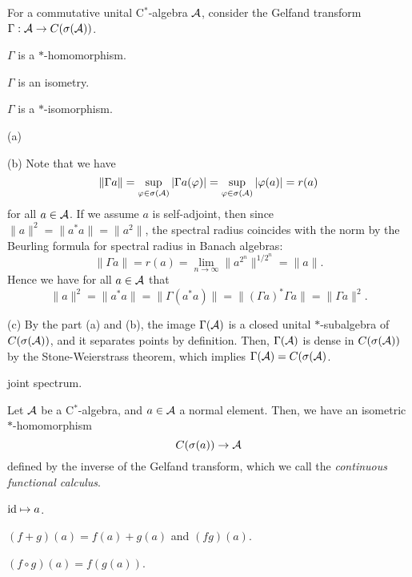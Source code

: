 \documentclass{../note}
\begin{document}
\begin{prb}
For a commutative unital C$^*$-algebra $\mathcal{A}$, consider the Gelfand transform $\Gamma:\mathcal{A}\to C(\sigma(\mathcal{A}))$.
\begin{parts}
\item $\Gamma$ is a $*$-homomorphism.
\item $\Gamma$ is an isometry.
\item $\Gamma$ is a $*$-isomorphism.
\end{parts}
\end{prb}
\begin{pf}
(a)

(b)
Note that we have
\[\|\Gamma a\|=\sup_{\varphi\in\sigma(\mathcal{A})}|\Gamma a(\varphi)|=\sup_{\varphi\in\sigma(\mathcal{A})}|\varphi(a)|=r(a)\]
for all $a\in\mathcal{A}$.
If we assume $a$ is self-adjoint, then since $\|a\|^2=\|a^*a\|=\|a^2\|$, the spectral radius coincides with the norm by the Beurling formula for spectral radius in Banach algebras:
\[\|\Gamma a\|=r(a)=\lim_{n\to\infty}\|a^{2^n}\|^{1/2^n}=\|a\|.\]
Hence we have for all $a\in\mathcal{A}$ that
\[\|a\|^2=\|a^*a\|=\|\Gamma(a^*a)\|=\|(\Gamma a)^*\Gamma a\|=\|\Gamma a\|^2.\]

(c)
By the part (a) and (b), the image $\Gamma(\mathcal{A})$ is a closed unital $*$-subalgebra of $C(\sigma(\mathcal{A}))$, and it separates points by definition.
Then, $\Gamma(\mathcal{A})$ is dense in $C(\sigma(\mathcal{A}))$ by the Stone-Weierstrass theorem, which implies $\Gamma(\mathcal{A})=C(\sigma(\mathcal{A})$.
\end{pf}



\begin{prb}
joint spectrum.
\end{prb}


\begin{prb}
Let $\mathcal{A}$ be a C$^*$-algebra, and $a\in\mathcal{A}$ a normal element.
Then, we have an isometric $*$-homomorphism
\[C(\sigma(a))\to\mathcal{A}\]
defined by the inverse of the Gelfand transform, which we call the \emph{continuous functional calculus}.
\begin{parts}
\item $\operatorname{id}\mapsto a$.
\item $(f+g)(a)=f(a)+g(a)$ and $(fg)(a)$.
\item $(f\circ g)(a)=f(g(a))$.
\end{parts}
\end{prb}
\end{document}
